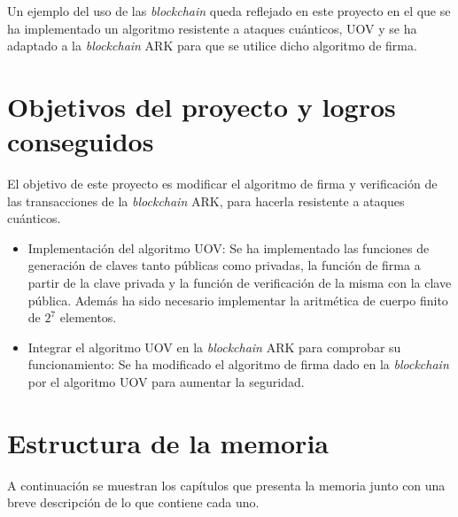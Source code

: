 Un ejemplo del uso de las \textit{blockchain} queda reflejado en este proyecto en el que se ha implementado un algoritmo resistente a ataques cuánticos, UOV \cite{algoritmo-UOV} y se ha adaptado a la \textit{blockchain} ARK \cite{ark} para que se utilice dicho algoritmo de firma.\\


\section{Objetivos del proyecto y logros conseguidos}
\label{sec:intro:objetivos}
El objetivo de este proyecto es modificar el algoritmo de firma y verificación de las transacciones de la \textit{blockchain} ARK, para hacerla resistente a ataques cuánticos.

\begin{itemize}
	\item Implementación del algoritmo UOV: Se ha implementado las funciones de generación de claves tanto públicas como privadas, la función de firma a partir de la clave privada y la función de verificación de la misma con la clave pública. Además ha sido necesario implementar la aritmética de cuerpo finito de $2^7$ elementos.
	\item Integrar el algoritmo UOV en la \textit{blockchain} ARK para comprobar su funcionamiento: Se ha modificado el algoritmo de firma dado en la \textit{blockchain} por el algoritmo UOV para aumentar la seguridad.

\end{itemize}


\section{Estructura de la memoria}

A continuación se muestran los capítulos que presenta la memoria junto con una breve descripción de lo que contiene cada uno.

